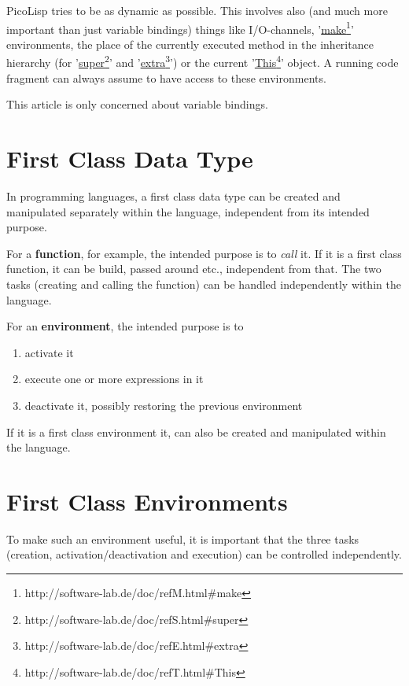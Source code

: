 PicoLisp tries to be as dynamic as possible. This involves also (and
much more important than just variable bindings) things like
I/O-channels,
'\underline{make}\footnote{http://software-lab.de/doc/refM.html\#make}'
environments, the place of the currently executed method in the
inheritance hierarchy (for
'\underline{super}\footnote{http://software-lab.de/doc/refS.html\#super}'
and
'\underline{extra}\footnote{http://software-lab.de/doc/refE.html\#extra}')
or the current
'\underline{This}\footnote{http://software-lab.de/doc/refT.html\#This}'
object. A running code fragment can always assume to have access to
these environments.

This article is only concerned about variable bindings.

\section{First Class Data Type}
\label{sec:firstclass-first-class-data-type}

In programming languages, a first class data type can be created and manipulated
separately within the language, independent from its intended purpose.

For a \textbf{function}, for example, the intended purpose is to \textit{call} it. If it is
a first class function, it can be build, passed around etc., independent from
that. The two tasks (creating and calling the function) can be handled
independently within the language.

For an \textbf{environment}, the intended purpose is to
\begin{enumerate}
   \item activate it
   \item execute one or more expressions in it
   \item deactivate it, possibly restoring the previous environment
\end{enumerate}
If it is a first class environment it, can also be created and manipulated
within the language.

\section{First Class Environments}
\label{sec:firstclass-first-class-environments}

To make such an environment useful, it is important that the three tasks
(creation, activation/deactivation and execution) can be controlled
independently.

